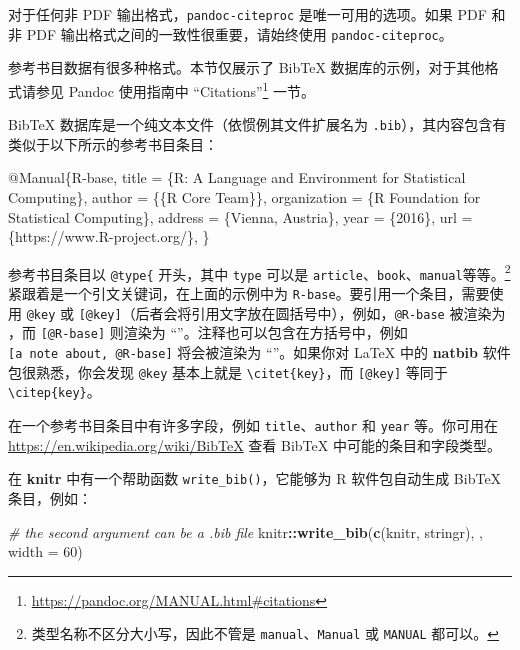 \documentclass[
  12pt,
]{krantz}
\newenvironment{Shaded}{\begin{snugshade}}{\end{snugshade}}
\newcommand{\AttributeTok}[1]{\textcolor[rgb]{0.13,0.29,0.53}{#1}}
\newcommand{\CommentTok}[1]{\textcolor[rgb]{0.56,0.35,0.01}{\textit{#1}}}
\newcommand{\DataTypeTok}[1]{\textcolor[rgb]{0.13,0.29,0.53}{#1}}
\newcommand{\DecValTok}[1]{\textcolor[rgb]{0.00,0.00,0.81}{#1}}
\newcommand{\FunctionTok}[1]{\textcolor[rgb]{0.13,0.29,0.53}{\textbf{#1}}}
\newcommand{\NormalTok}[1]{#1}
\newcommand{\OtherTok}[1]{\textcolor[rgb]{0.56,0.35,0.01}{#1}}
\newcommand{\SpecialCharTok}[1]{\textcolor[rgb]{0.81,0.36,0.00}{\textbf{#1}}}
\newcommand{\StringTok}[1]{\textcolor[rgb]{0.31,0.60,0.02}{#1}}
\newcommand{\VariableTok}[1]{\textcolor[rgb]{0.00,0.00,0.00}{#1}}
\renewcommand{\href}[2]{#2\footnote{\url{#1}}}
\theoremstyle{definition}
\theoremstyle{definition}
\theoremstyle{definition}
\theoremstyle{definition}
\theoremstyle{remark}
\begin{document}
对于任何非 PDF 输出格式，\texttt{pandoc-citeproc} 是唯一可用的选项。如果 PDF 和非 PDF 输出格式之间的一致性很重要，请始终使用 \texttt{pandoc-citeproc}。

参考书目数据有很多种格式。本节仅展示了 BibTeX 数据库的示例，对于其他格式请参见 Pandoc 使用指南中 \href{https://pandoc.org/MANUAL.html\#citations}{``Citations''} 一节。

BibTeX 数据库是一个纯文本文件（依惯例其文件扩展名为 \texttt{.bib}），其内容包含有类似于以下所示的参考书目条目：

\begin{Shaded}
\begin{Highlighting}[]
\VariableTok{@Manual}\NormalTok{\{}\OtherTok{R}\NormalTok{{-}}\OtherTok{base}\NormalTok{,}
  \DataTypeTok{title}\NormalTok{ = \{R: A Language and Environment for Statistical}
\NormalTok{    Computing\},}
  \DataTypeTok{author}\NormalTok{ = \{\{R Core Team\}\},}
  \DataTypeTok{organization}\NormalTok{ = \{R Foundation for Statistical Computing\},}
  \DataTypeTok{address}\NormalTok{ = \{Vienna, Austria\},}
  \DataTypeTok{year}\NormalTok{ = \{2016\},}
  \DataTypeTok{url}\NormalTok{ = \{https://www.R{-}project.org/\},}
\NormalTok{\}}
\end{Highlighting}
\end{Shaded}

参考书目条目以 \texttt{@type\{} 开头，其中 \texttt{type} 可以是 \texttt{article}、\texttt{book}、\texttt{manual}等等。\footnote{类型名称不区分大小写，因此不管是 \texttt{manual}、\texttt{Manual} 或 \texttt{MANUAL} 都可以。}紧跟着是一个引文关键词，在上面的示例中为 \texttt{R-base}。要引用一个条目，需要使用 \texttt{@key} 或 \texttt{{[}@key{]}}（后者会将引用文字放在圆括号中），例如，\texttt{@R-base} 被渲染为 \citet{R-base}，而 \texttt{{[}@R-base{]}} 则渲染为 ``\citep{R-base}''。注释也可以包含在方括号中，例如 \texttt{{[}a\ note\ about,\ @R-base{]}} 将会被渲染为 ``\citep[a note about,][]{R-base}''。如果你对 LaTeX 中的 \textbf{natbib} 软件包很熟悉，你会发现 \texttt{@key} 基本上就是 \texttt{\textbackslash{}citet\{key\}}，而 \texttt{{[}@key{]}} 等同于 \texttt{\textbackslash{}citep\{key\}}。

在一个参考书目条目中有许多字段，例如 \texttt{title}、\texttt{author} 和 \texttt{year} 等。你可用在 \url{https://en.wikipedia.org/wiki/BibTeX} 查看 BibTeX 中可能的条目和字段类型。

在 \textbf{knitr} 中有一个帮助函数 \texttt{write\_bib()}，它能够为 R 软件包自动生成 BibTeX 条目，例如：

\begin{Shaded}
\begin{Highlighting}[]
\CommentTok{\# the second argument can be a .bib file}
\NormalTok{knitr}\SpecialCharTok{::}\FunctionTok{write\_bib}\NormalTok{(}\FunctionTok{c}\NormalTok{(}\StringTok{\textquotesingle{}knitr\textquotesingle{}}\NormalTok{, }\StringTok{\textquotesingle{}stringr\textquotesingle{}}\NormalTok{), }\StringTok{\textquotesingle{}\textquotesingle{}}\NormalTok{, }\AttributeTok{width =} \DecValTok{60}\NormalTok{)}
\end{Highlighting}
\end{Shaded}
\end{document}
